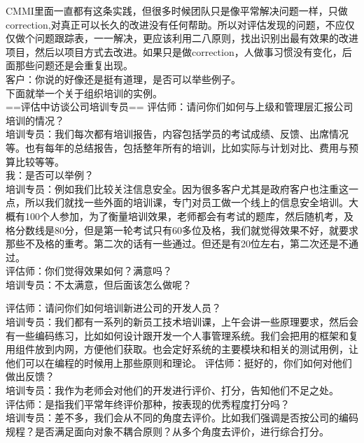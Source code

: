 CMMI里面一直都有这条实践，但很多时候团队只是像平常解决问题一样，只做correction,对真正可以长久的改进没有任何帮助。所以对评估发现的问题，不应仅仅做个问题跟踪表，一一解决，更应该利用二八原则，找出识别出最有效果的改进项目，然后以项目方式去改进。如果只是做correction，人做事习惯没有变化，后面那些问题还是会重复出现。\\
客户：你说的好像还是挺有道理，是否可以举些例子。\\
下面就举一个关于组织培训的实例。\\
==评估中访谈公司培训专员==
评估师：请问你们如何与上级和管理层汇报公司培训的情况？\\
培训专员：我们每次都有培训报告，内容包括学员的考试成绩、反馈、出席情况等。也有每年的总结报告，包括整年所有的培训，比如实际与计划对比、费用与预算比较等等。\\
我：是否可以举例？\\
培训专员：例如我们比较关注信息安全。因为很多客户尤其是政府客户也注重这一点，所以我们就找一些外面的培训课，专门对员工做一个线上的信息安全培训。大概有100个人参加，为了衡量培训效果，老师都会有考试的题库，然后随机考，及格分数线是80分，但是第一轮考试只有60多位及格，我们就觉得效果不好，就要求那些不及格的重考。第二次的话有一些通过。但还是有20位左右，第二次还是不通过。\\
评估师：你们觉得效果如何？满意吗？\\
培训专员：不太满意，但后面该怎么做呢？

\begin{description}
\item[]
\end{description}

评估师：请问你们如何培训新进公司的开发人员？\\
培训专员：我们都有一系列的新员工技术培训课，上午会讲一些原理要求，然后会有一些编码练习，比如如何设计跟开发一个人事管理系统。我们会把用的框架和复用组件放到内网，方便他们获取。也会定好系统的主要模块和相关的测试用例，让他们可以在编程的时候用上那些原则和理论。
评估师：挺好的，你们如何对他们做出反馈？\\
培训专员：我作为老师会对他们的开发进行评价、打分，告知他们不足之处。\\
评估师：是指我们平常年终评价那种，按表现的优秀程度打分吗？\\
培训专员：差不多，我们会从不同的角度去评价。比如我们强调是否按公司的编码规程？是否满足面向对象不耦合原则？从多个角度去评价，进行综合打分。\\


